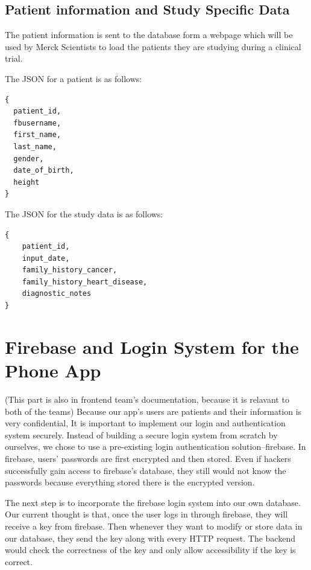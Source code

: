 \documentclass[]{book}
\begin{document}
\subsection{Patient information and Study Specific
Data}\label{patient-information-and-study-specific-data}

The patient information is sent to the database form a webpage which
will be used by Merck Scientists to load the patients they are studying
during a clinical trial.

The JSON for a patient is as follows:

\begin{verbatim}
{
  patient_id,
  fbusername,
  first_name,
  last_name,
  gender,
  date_of_birth,
  height
}
\end{verbatim}

The JSON for the study data is as follows:

\begin{verbatim}
{
    patient_id,
    input_date,
    family_history_cancer,
    family_history_heart_disease,
    diagnostic_notes
}
\end{verbatim}

\section{Firebase and Login System for the Phone
App}\label{firebase-and-login-system-for-the-phone-app}

(This part is also in frontend team's documentation, because it is
relavant to both of the teams) Because our app's users are patients and
their information is very confidential, It is important to implement our
login and authentication system securely. Instead of building a secure
login system from scratch by ourselves, we chose to use a pre-existing
login authentication solution--firebase. In firebase, users' passwords
are first encrypted and then stored. Even if hackers successfully gain
access to firebase's database, they still would not know the passwords
because everything stored there is the encrypted version.

The next step is to incorporate the firebase login system into our own
database. Our current thought is that, once the user logs in through
firebase, they will receive a key from firebase. Then whenever they want
to modify or store data in our database, they send the key along with
every HTTP request. The backend would check the correctness of the key
and only allow accessibility if the key is correct.
\end{document}
